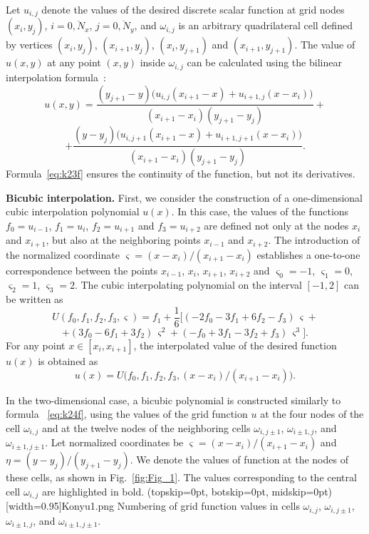 \documentclass{ieeeaccess}
\begin{document}
Let $u_{i,j}$ denote the values of the desired  discrete scalar function at grid nodes $(x_i, y_j)$,  $i = \overline{0,N_x}$, $j = \overline{0,N_y}$, and $\omega_ {i,j}$ is an arbitrary quadrilateral cell  defined by  vertices $(x_i, y_j)$, $(x_{i+1}, y_j)$, $(x_i, y_{j+1})$ and $(x_{i+1}, y_{j+1})$. The value of $u(x, y)$ at any  point $(x, y)$ inside $\omega_{i,j}$ can be calculated using the bilinear interpolation formula~\cite{Getreur_LI}:
%
$$
u(x,y) = \frac{(y_{j + 1} - y)\big( u_{i,j}(x_{i + 1} - x) + u_{i + 1,j}(x - x_i) \big)}{(x_{i + 1} - x_i)(y_{j + 1} - y_j)} +
$$
%
\begin{equation}\label{eq:k23f}
+ \frac{(y - y_j)\big( u_{i,j + 1}(x_{i + 1} - x) + u_{i + 1,j + 1}(x - x_i) \big)}{(x_{i + 1} - x_i)(y_{j + 1} - y_j)}.
\end{equation}
%
Formula~\eqref{eq:k23f} ensures the continuity of the function, but not its derivatives.

\textbf{Bicubic interpolation.}
First, we consider the construction of a one-dimensional cubic interpolation polynomial $u(x)$. In this case, the values of the functions $f_0 = u_{i-1}$, $f_1 = u_i$, $f_2 = u_{i+1}$ and $f_3 = u_{i+2}$ are defined not only at the nodes $x_i$ and $x_{i+1}$, but also at the neighboring points $x_{i-1}$ and $x_{i+2}$. The introduction of the normalized coordinate
$
\varsigma  = (x - x_i)/(x_{i+1} - x_i)
$
establishes a one-to-one correspondence between the points $x_{i-1}$, $x_i$, $x_{i+1}$, $x_{i+2}$ and $\varsigma_0 = -1$, $\varsigma_1 = 0$, $\varsigma_2 = 1$, $\varsigma_3 = 2$. The cubic interpolating polynomial on the interval $[-1, 2]$ can be written as ~\cite{Getreur_LI}
%
$$
U(f_{0}, f_{1}, f_{2}, f_{3},\varsigma ) =
f_1 + \frac{1}{6}\Big[ (-2f_{0} - 3f_1 + 6f_2 - f_3)\,\varsigma +
$$
%
\begin{equation}\label{eq:k24f}
+ (3f_0 - 6f_{1} + 3f_2)\,\varsigma^2 
+ (-f_{0} + 3f_1 - 3f_2 + f_3)\,\varsigma^3 
\Big].
\end{equation}
%
For any point $x\in [x_i, x_{i+1}]$, the interpolated value of the desired function $u(x)$ is obtained as
$$
u(x) = U\big(f_0, f_1, f_2, f_3, (x - x_i)/(x_{i+1} - x_i)\big).
$$

In the two-dimensional case, a bicubic polynomial is constructed similarly to formula ~\eqref{eq:k24f}, using the values of the grid function $u$ at the four nodes of the cell $\omega_{i,j}$ and at the twelve nodes of the neighboring cells $\omega_{i,j\pm 1}$, 
$\omega_{i \pm 1,j}$, and $\omega_{i \pm 1,j \pm 1}$. 
Let normalized coordinates be
$ \varsigma = (x - x_i)/(x_{i+1} - x_i)$ 
and $ \eta = (y - y_j)/(y_{j+1} - y_j)$. We denote the values of function at the nodes of these cells, as shown in Fig.~\ref{fig:Fig_1}. 
The values corresponding to the central cell $\omega_{i,j}$ are highlighted in bold.
\Figure[ht!](topskip=0pt, botskip=0pt, midskip=0pt)[width=0.95\linewidth]{Konyu1.png}
{Numbering of grid function values in cells $\omega_{i,j}$, $\omega_{i,j \pm 1}$, $\omega_{i \pm 1,j}$, and $\omega_{i \pm 1,j \pm 1}$.
\label{fig:Fig_1}}
\end{document}
